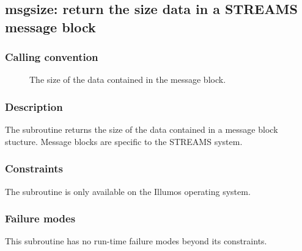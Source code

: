 \clearpage
{}
{}
\label{subr:msgsize}
\subsection*{msgsize: return the size data in a  STREAMS message block}

\subsubsection*{Calling convention}

\begin{description}
\item[] The size of the data contained in the
  message block.
\end{description}

\subsubsection*{Description}

The  subroutine returns the size of the data
contained in a message block stucture.  Message blocks are specific to
the STREAMS system.

\subsubsection*{Constraints}

The  subroutine is only available on the Illumos
operating system.

\subsubsection*{Failure modes}

This subroutine has no run-time failure modes beyond its constraints.
